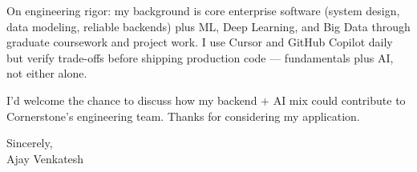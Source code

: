 \documentclass[letterpaper,11pt]{article}
\begin{document}
On engineering rigor: my background is core enterprise software (system design, data modeling, reliable backends) plus ML, Deep Learning, and Big Data through graduate coursework and project work. I use Cursor and GitHub Copilot daily but verify trade-offs before shipping production code --- fundamentals plus AI, not either alone.

I'd welcome the chance to discuss how my backend + AI mix could contribute to Cornerstone's engineering team. Thanks for considering my application.

\vspace{12pt}

Sincerely, \\
Ajay Venkatesh
\end{document}
